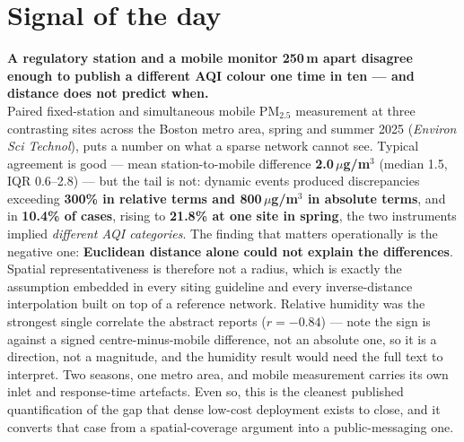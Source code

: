 \documentclass[10pt]{article}
\begin{document}
\vspace{6mm}

\section*{\sffamily\bfseries\color{Deep}Signal of the day}
\vspace{-1.5mm}{\color{Amber}\rule{\linewidth}{1.1pt}}\vspace{2.5mm}

\begin{keybox}
{\sffamily\bfseries\small\color{Deep}A regulatory station and a mobile monitor 250\,m apart
disagree enough to publish a different AQI colour one time in ten --- and distance does not
predict when.}\\[1.4mm]
\footnotesize
Paired fixed-station and simultaneous mobile PM$_{2.5}$ measurement at three contrasting
sites across the Boston metro area, spring and summer 2025 (\textit{Environ Sci Technol}),
puts a number on what a sparse network cannot see. Typical agreement is good --- mean
station-to-mobile difference \textbf{2.0\,$\mu$g/m$^3$} (median 1.5, IQR 0.6--2.8) --- but
the tail is not: dynamic events produced discrepancies exceeding \textbf{300\% in relative
terms and 800\,$\mu$g/m$^3$ in absolute terms}, and in \textbf{10.4\% of cases}, rising to
\textbf{21.8\% at one site in spring}, the two instruments implied \emph{different AQI
categories}. The finding that matters operationally is the negative one: \textbf{Euclidean
distance alone could not explain the differences}. Spatial representativeness is therefore
not a radius, which is exactly the assumption embedded in every siting guideline and every
inverse-distance interpolation built on top of a reference network. Relative humidity was
the strongest single correlate the abstract reports ($r=-0.84$) --- note the sign is against
a signed centre-minus-mobile difference, not an absolute one, so it is a direction, not a
magnitude, and the humidity result would need the full text to interpret. Two seasons, one
metro area, and mobile measurement carries its own inlet and response-time artefacts. Even
so, this is the cleanest published quantification of the gap that dense low-cost deployment
exists to close, and it converts that case from a spatial-coverage argument into a
public-messaging one.
\end{keybox}

\vspace{3mm}
\end{document}
